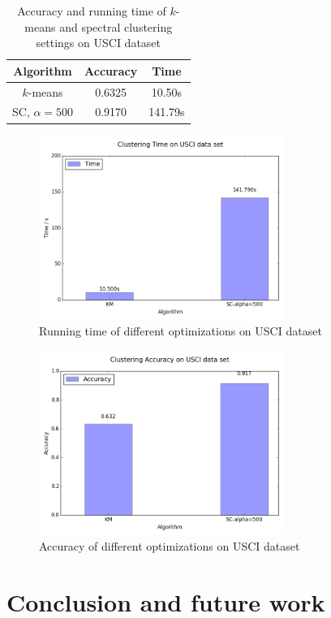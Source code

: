 \documentclass{acm_proc_article-sp}
\begin{document}
\begin{table}
\centering
\begin{tabular}{|c|cc|}
\hline
Algorithm & Accuracy & Time \\
\hline
 $k$-means & 0.6325 & 10.50s\\
 SC, $\alpha=500$ & 0.9170 & 141.79s\\
 \hline
\end{tabular}
\caption{Accuracy and running time of $k$-means and spectral clustering settings on USCI dataset}
\label{table_usci}
\end{table}

\begin{figure}
\centering
\includegraphics[height=6cm]{ut.png}
\caption{Running time of different optimizations on USCI dataset}
\label{figure_musk_time}
\end{figure}

\begin{figure}
\centering
\includegraphics[height=6cm]{ua.png}
\caption{Accuracy of different optimizations on USCI dataset}
\label{figure_musk_accu}
\end{figure}

\section{Conclusion and future work}
\end{document}
